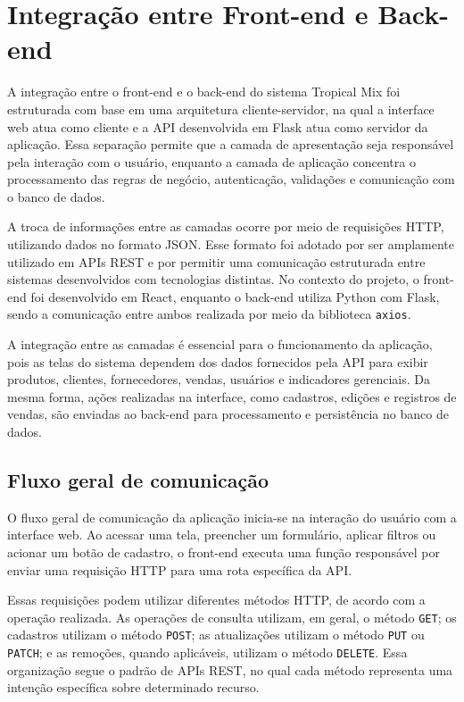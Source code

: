 \section{Integração entre Front-end e Back-end}

A integração entre o front-end e o back-end do sistema Tropical Mix foi estruturada com base em uma arquitetura cliente-servidor, na qual a interface web atua como cliente e a API desenvolvida em Flask atua como servidor da aplicação. Essa separação permite que a camada de apresentação seja responsável pela interação com o usuário, enquanto a camada de aplicação concentra o processamento das regras de negócio, autenticação, validações e comunicação com o banco de dados.

A troca de informações entre as camadas ocorre por meio de requisições HTTP, utilizando dados no formato JSON. Esse formato foi adotado por ser amplamente utilizado em APIs REST e por permitir uma comunicação estruturada entre sistemas desenvolvidos com tecnologias distintas. No contexto do projeto, o front-end foi desenvolvido em React, enquanto o back-end utiliza Python com Flask, sendo a comunicação entre ambos realizada por meio da biblioteca \texttt{axios}.

A integração entre as camadas é essencial para o funcionamento da aplicação, pois as telas do sistema dependem dos dados fornecidos pela API para exibir produtos, clientes, fornecedores, vendas, usuários e indicadores gerenciais. Da mesma forma, ações realizadas na interface, como cadastros, edições e registros de vendas, são enviadas ao back-end para processamento e persistência no banco de dados.

\subsection{Fluxo geral de comunicação}

O fluxo geral de comunicação da aplicação inicia-se na interação do usuário com a interface web. Ao acessar uma tela, preencher um formulário, aplicar filtros ou acionar um botão de cadastro, o front-end executa uma função responsável por enviar uma requisição HTTP para uma rota específica da API.

Essas requisições podem utilizar diferentes métodos HTTP, de acordo com a operação realizada. As operações de consulta utilizam, em geral, o método \texttt{GET}; os cadastros utilizam o método \texttt{POST}; as atualizações utilizam o método \texttt{PUT} ou \texttt{PATCH}; e as remoções, quando aplicáveis, utilizam o método \texttt{DELETE}. Essa organização segue o padrão de APIs REST, no qual cada método representa uma intenção específica sobre determinado recurso.


